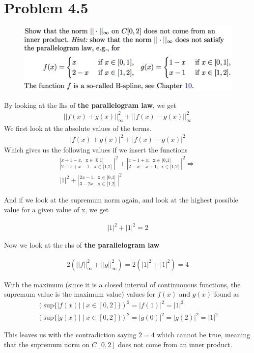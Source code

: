 \documentclass{article}
\begin{document}
\section*{Problem 4.5}
\begin{figure}[h!]
    \centering
    \includegraphics[width=\textwidth]{Fig/prob45}
\end{figure}

By looking at the lhs of \textbf{the parallelogram law}, we get 
\begin{gather*}
    ||f(x) + g(x)||_\infty^2 + ||f(x)-g(x)||_\infty^2
\end{gather*}
We first look at the absolute values of the terms.
\begin{gather*}
    |f(x) + g(x)|^2 + |f(x)-g(x)|^2
\end{gather*}
Which gives us the following values if we insert the functions
\begin{gather*}
    \left|_{2-x+x-1,\: \text{x $\in$ [1,2]}}^{x+1-x,\: \text{x $\in$ [0,1]}}\right|^2 + \left|_{2-x-x+1,\: \text{x $\in$ [1,2]}}^{x-1+x,\: \text{x $\in$ [0,1]}} \right|^2 \Rightarrow \\
    \left|1\right|^2 + \left|_{3-2x,\: \text{x $\in$ [1,2]}}^{2x-1,\: \text{x $\in$ [0,1]}} \right|^2
\end{gather*}

And if we look at the supremum norm again, and look at the highest possible value for a given value of x, we get

\begin{gather*}
    \left|1\right|^2 + \left|1\right|^2 = 2
\end{gather*}

Now we look at the rhs of \textbf{the parallelogram law}

\begin{gather*}
    2\left(||f||_\infty^2 + ||g||_\infty^2\right) = 2 ( |1|^2 + |1|^2 ) = 4
\end{gather*}

With the maximum (since it is a closed interval of continuouous functions, the supremum value is the maximum value) values for $f(x)$ and $g(x)$ found as
\begin{gather*}
   \left( \text{sup} \{|f(x)| \; | \; x \in [0,2]\} \right)^2 = |f(1)|^2 = |1|^2 \\
   \left( \text{sup} \{|g(x)| \; | \; x \in [0,2]\} \right)^2 = |g(0)|^2 = |g(2)|^2 = |1|^2
\end{gather*}

This leaves us with the contradiction saying $2=4$ which cannot be true, meaning that the supremum norm on $C[0,2]$ does not come from an inner product.
\end{document}

